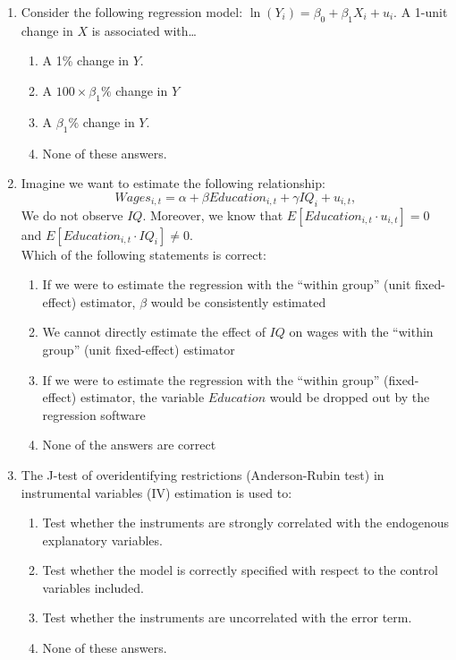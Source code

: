 \documentclass{article}
\begin{document}
\parindent

\begin{enumerate}

    \item Consider the following regression model: $\ln(Y_i) = \beta_0 + \beta_1 X_i + u_i$. A 1-unit change in $X$ is associated with…
    \begin{enumerate}[label=\alph*)]
        \item A 1\% change in $Y$.
        \item A $100 \times \beta_1 \%$ change in $Y$
        \item A $\beta_1 \%$ change in $Y$. %
        \item None of these answers.
    \end{enumerate}\vspace{.25cm}

   \item Imagine we want to estimate the following relationship:
\[
Wages_{i,t}=\alpha+\beta Education_{i,t}+ \gamma IQ_i+u_{i,t}, 
\]
We do not observe $IQ$. Moreover, we know that $E[Education_{i,t} \cdot u_{i,t}]=0$ and  $E[Education_{i,t} \cdot IQ_i]\neq 0$.\\ Which of the following statements is correct:
\begin{enumerate}[label=(\alph*)]
    \item If we were to estimate the regression with the ``within group'' (unit fixed-effect) estimator, $\beta$ would be consistently estimated
    \item We cannot directly estimate the effect of $IQ$ on wages with the ``within group'' (unit fixed-effect) estimator 
    \item If we were to estimate the regression with the ``within group'' (fixed-effect) estimator, the variable $Education$ would be dropped out by the regression software
    \item None of the answers are correct
\end{enumerate}\vspace{.25cm}


    \item The J-test of overidentifying restrictions (Anderson-Rubin test)  in instrumental variables (IV) estimation is used to:
    \begin{enumerate}[label=\alph*)]
        \item Test whether the instruments are strongly correlated with the endogenous explanatory variables.
        \item Test whether the model is correctly specified with respect to the control variables included.
        \item Test whether the instruments are uncorrelated with the error term.
        \item None of these answers.
    \end{enumerate}\vspace{.25cm}



\end{enumerate}
\end{document}
